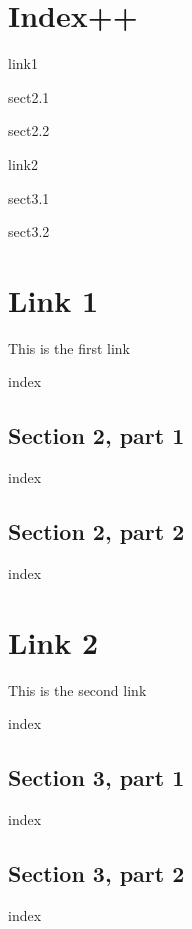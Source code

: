 \section{Index++}
 {link1}

 {sect2.1}

 {sect2.2}

 {link2}

 {sect3.1}

 {sect3.2}

\newpage
{}
\section{Link 1}
This is the first link

 {index}

\newpage
{}
\subsection{Section 2, part 1}
 {index}

\newpage
{}
\subsection{Section 2, part 2}
 {index}


\newpage
{}
\section{Link 2}
This is the second link

 {index}

\newpage
{}
\subsection{Section 3, part 1}
 {index}

\newpage
{}
\subsection{Section 3, part 2}
 {index}

\bye
